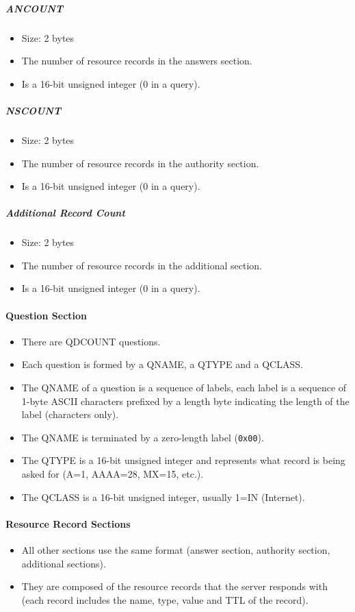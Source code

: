 \documentclass{article}
\begin{document}
\subparagraph{ANCOUNT}
\begin{itemize}
    \item Size: 2 bytes
    \item The number of resource records in the answers section.
    \item Is a 16-bit unsigned integer (0 in a query).
\end{itemize}

\subparagraph{NSCOUNT}
\begin{itemize}
    \item Size: 2 bytes
    \item The number of resource records in the authority section.
    \item Is a 16-bit unsigned integer (0 in a query).
\end{itemize}

\subparagraph{Additional Record Count}
\begin{itemize}
    \item Size: 2 bytes
    \item The number of resource records in the additional section.
    \item Is a 16-bit unsigned integer (0 in a query).
\end{itemize}

\paragraph{Question Section}
\begin{itemize}
    \item There are QDCOUNT questions.
    \item Each question is formed by a QNAME, a QTYPE and a QCLASS.
    \item The QNAME of a question is a sequence of labels, each label is a sequence of 1-byte ASCII characters prefixed by a length byte indicating the length of the label (characters only).
    \item The QNAME is terminated by a zero-length label (\texttt{0x00}).
    \item The QTYPE is a 16-bit unsigned integer and represents what record is being asked for (A=1, AAAA=28, MX=15, etc.).
    \item The QCLASS is a 16-bit unsigned integer, usually 1=IN (Internet).
\end{itemize}

\paragraph{Resource Record Sections}
\begin{itemize}
    \item All other sections use the same format (answer section, authority section, additional sections).
    \item They are composed of the resource records that the server responds with (each record includes the name, type, value and TTL of the record).
\end{itemize}
\end{document}
